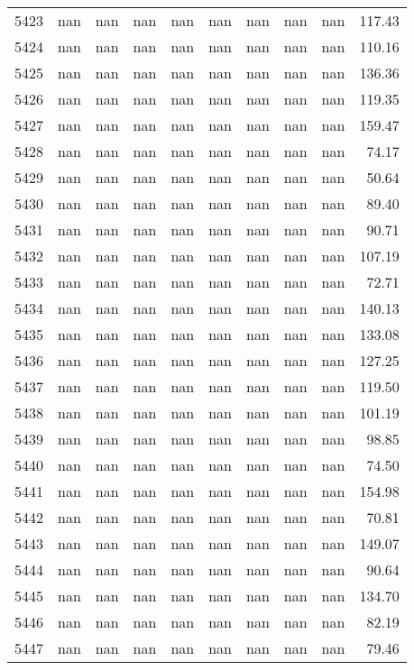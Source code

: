 \begin{tabular}{lrrrrrrrrr}
5423 & nan & nan & nan & nan & nan & nan & nan & nan & 117.43 \\
5424 & nan & nan & nan & nan & nan & nan & nan & nan & 110.16 \\
5425 & nan & nan & nan & nan & nan & nan & nan & nan & 136.36 \\
5426 & nan & nan & nan & nan & nan & nan & nan & nan & 119.35 \\
5427 & nan & nan & nan & nan & nan & nan & nan & nan & 159.47 \\
5428 & nan & nan & nan & nan & nan & nan & nan & nan & 74.17 \\
5429 & nan & nan & nan & nan & nan & nan & nan & nan & 50.64 \\
5430 & nan & nan & nan & nan & nan & nan & nan & nan & 89.40 \\
5431 & nan & nan & nan & nan & nan & nan & nan & nan & 90.71 \\
5432 & nan & nan & nan & nan & nan & nan & nan & nan & 107.19 \\
5433 & nan & nan & nan & nan & nan & nan & nan & nan & 72.71 \\
5434 & nan & nan & nan & nan & nan & nan & nan & nan & 140.13 \\
5435 & nan & nan & nan & nan & nan & nan & nan & nan & 133.08 \\
5436 & nan & nan & nan & nan & nan & nan & nan & nan & 127.25 \\
5437 & nan & nan & nan & nan & nan & nan & nan & nan & 119.50 \\
5438 & nan & nan & nan & nan & nan & nan & nan & nan & 101.19 \\
5439 & nan & nan & nan & nan & nan & nan & nan & nan & 98.85 \\
5440 & nan & nan & nan & nan & nan & nan & nan & nan & 74.50 \\
5441 & nan & nan & nan & nan & nan & nan & nan & nan & 154.98 \\
5442 & nan & nan & nan & nan & nan & nan & nan & nan & 70.81 \\
5443 & nan & nan & nan & nan & nan & nan & nan & nan & 149.07 \\
5444 & nan & nan & nan & nan & nan & nan & nan & nan & 90.64 \\
5445 & nan & nan & nan & nan & nan & nan & nan & nan & 134.70 \\
5446 & nan & nan & nan & nan & nan & nan & nan & nan & 82.19 \\
5447 & nan & nan & nan & nan & nan & nan & nan & nan & 79.46 \\

\end{tabular}
